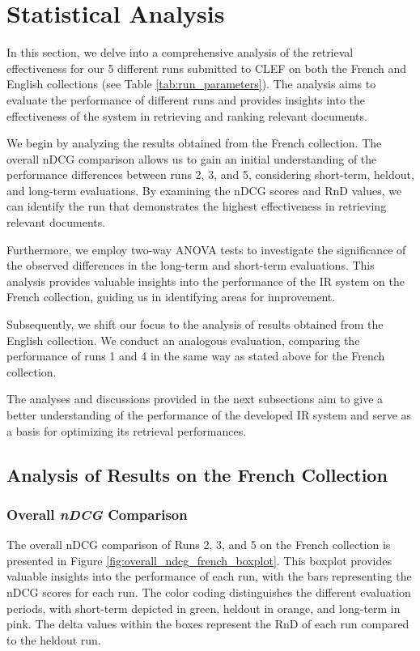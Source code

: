 \section{Statistical Analysis}
\label{sec:analysis}

In this section, we delve into a comprehensive analysis of the retrieval effectiveness for our 5 different runs submitted to \ac{CLEF} on both the French and English collections (see Table \ref{tab:run_parameters}). 
The analysis aims to evaluate the performance of different runs and provides insights into the effectiveness of the system in retrieving and ranking relevant documents.

We begin by analyzing the results obtained from the French collection. 
The overall \ac{nDCG} comparison allows us to gain an initial understanding of the performance differences between runs 2, 3, and 5, considering short-term, heldout, and long-term evaluations. 
By examining the \ac{nDCG} scores and \ac{RnD} values, we can identify the run that demonstrates the highest effectiveness in retrieving relevant documents.

Furthermore, we employ two-way \ac{ANOVA} tests to investigate the significance of the observed differences in the long-term and short-term evaluations. 
This analysis provides valuable insights into the performance of the \ac{IR} system on the French collection, guiding us in identifying areas for improvement.

Subsequently, we shift our focus to the analysis of results obtained from the English collection. 
We conduct an analogous evaluation, comparing the performance of runs 1 and 4 in the same way as stated above for the French collection. 

The analyses and discussions provided in the next subsections aim to give a better understanding of the performance of the developed \ac{IR} system and serve as a basis for optimizing its retrieval performances.


\newpage
\subsection{Analysis of Results on the French Collection}
\enlargethispage{5\baselineskip}
\subsubsection{Overall \textit{nDCG} Comparison}  \label{sec:ndcg_comparison_french}

The overall \ac{nDCG} comparison of Runs 2, 3, and 5 on the French collection is presented in Figure \ref{fig:overall_ndcg_french_boxplot}. 
This boxplot provides valuable insights into the performance of each run, with the bars representing the \ac{nDCG} scores for each run. 
The color coding distinguishes the different evaluation periods, with short-term depicted in green, heldout in orange, and long-term in pink. 
The delta values within the boxes represent the \ac{RnD} of each run compared to the heldout run.


